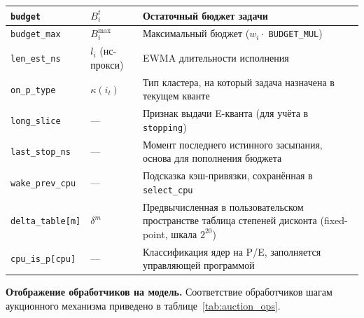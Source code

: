 \documentclass[14pt, oneside]{extbook}
\begin{document}
\begin{center}
\begin{longtable}{|P{5cm}|P{2.5cm}|P{7cm}|}
                        \hline
                        \texttt{budget} & $B_i^t$ &
                                Остаточный бюджет задачи \\
                        \hline
                        \texttt{budget\_max} & $B_i^{\max}$ &
                                Максимальный бюджет
                                ($w_i \cdot$ \texttt{BUDGET\_MUL}) \\
                        \hline
                        \texttt{len\_est\_ns} & $l_i$ (нс-прокси) &
                                EWMA длительности исполнения \\
                        \hline
                        \texttt{on\_p\_type} & $\kappa(i_t)$ &
                                Тип кластера, на который задача
                                назначена в текущем кванте \\
                        \hline
                        \texttt{long\_slice} & --- &
                                Признак выдачи E-кванта (для
                                учёта в \texttt{stopping}) \\
                        \hline
                        \texttt{last\_stop\_ns} & --- &
                                Момент последнего истинного
                                засыпания, основа для
                                пополнения бюджета \\
                        \hline
                        \texttt{wake\_prev\_cpu} & --- &
                                Подсказка кэш-привязки,
                                сохранённая в \texttt{select\_cpu} \\
                        \hline
                        \texttt{delta\_table[m]} & $\delta^m$ &
                                Предвычисленная в
                                пользовательском пространстве
                                таблица степеней дисконта
                                (fixed-point, шкала $2^{20}$) \\
                        \hline
                        \texttt{cpu\_is\_p[cpu]} & --- &
                                Классификация ядер на P/E,
                                заполняется управляющей
                                программой \\
                        \hline
        \end{longtable}
        \end{center}

        \textbf{Отображение обработчиков на модель.}
        Соответствие обработчиков шагам аукционного механизма
        приведено в таблице~\ref{tab:auction_ops}.
\end{document}
